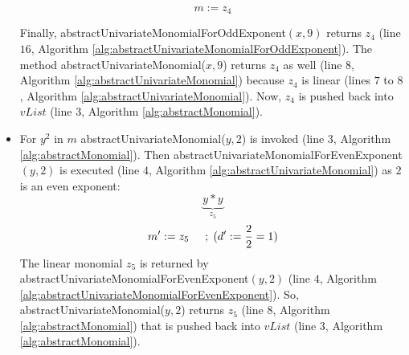 \begin{example}
\begin{itemize}
\tikzset{every picture/.style=remember picture}
\begin{figure}[H]
\centering
{}
\end{figure}
        
        $$m := z_{4}$$
        \begin{sloppypar}
        Finally, abstractUnivariateMonomialForOddExponent$(x, 9)$ returns $z_{4}$ (line $16$, Algorithm \ref{alg:abstractUnivariateMonomialForOddExponent}).
        The method abstractUnivariateMonomial($x, 9$) returns $z_{4}$ as well (line $8$, Algorithm \ref{alg:abstractUnivariateMonomial}) because $z_{4}$ is linear (lines $7$ to $8$, Algorithm \ref{alg:abstractUnivariateMonomial}).
        Now, $z_{4}$ is pushed back into $vList$ (line $3$, Algorithm \ref{alg:abstractMonomial}).
        \end{sloppypar}
        
\tikzset{every picture/.style=remember picture}
\begin{figure}[H]
\centering
{}
\end{figure}

        \item For $y^2$ in $m$ abstractUnivariateMonomial($y, 2$) is invoked (line $3$, Algorithm \ref{alg:abstractMonomial}).
        Then abstractUnivariateMonomialForEvenExponent$(y, 2)$ is executed (line $4$, Algorithm \ref{alg:abstractUnivariateMonomial}) as $2$ is an even exponent:
        $$\underbrace{ y \ast y }\limits_{z_{5}}$$
        $$m^\prime := z_{5} \hspace{5mm} ;\hspace{1mm}(d^\prime := \frac{2}{2} = 1)$$
        The linear monomial $z_{5}$ is returned by abstractUnivariateMonomialForEvenExponent$(y, 2)$ (line $4$, Algorithm \ref{alg:abstractUnivariateMonomialForEvenExponent}).
        So, abstractUnivariateMonomial($y, 2$) returns $z_{5}$ (line $8$, Algorithm \ref{alg:abstractMonomial}) that is pushed back into $vList$ (line $3$, Algorithm \ref{alg:abstractMonomial}).
        

\end{itemize}
\end{example}
